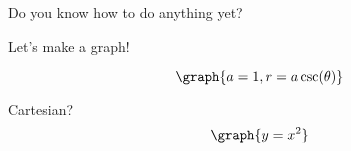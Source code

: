 \documentclass{ximera}
\begin{document}
\begin{question}

Do you know how to do anything yet?
\begin{multipleChoice}




\end{multipleChoice}

\end{question}

Let's make a graph!

\[
\graph{a=1,r=a \csc(\theta)}
\]

Cartesian?
\[
\graph{y=x^2}
\]
\end{document}
